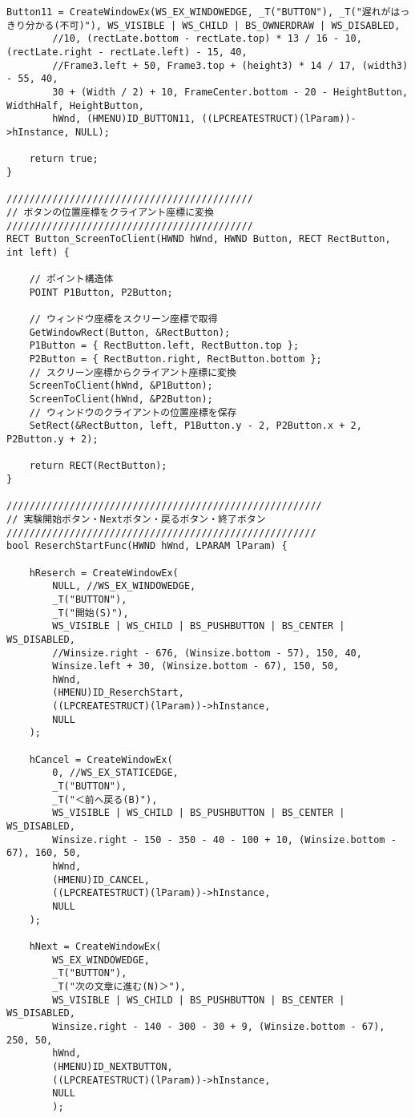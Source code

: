 \begin{lstlisting}[caption=window.cpp]
	Button11 = CreateWindowEx(WS_EX_WINDOWEDGE, _T("BUTTON"), _T("遅れがはっきり分かる(不可)"), WS_VISIBLE | WS_CHILD | BS_OWNERDRAW | WS_DISABLED,
		//10, (rectLate.bottom - rectLate.top) * 13 / 16 - 10, (rectLate.right - rectLate.left) - 15, 40,
		//Frame3.left + 50, Frame3.top + (height3) * 14 / 17, (width3) - 55, 40,
		30 + (Width / 2) + 10, FrameCenter.bottom - 20 - HeightButton, WidthHalf, HeightButton,
		hWnd, (HMENU)ID_BUTTON11, ((LPCREATESTRUCT)(lParam))->hInstance, NULL);

	return true;
}

///////////////////////////////////////////
// ボタンの位置座標をクライアント座標に変換
///////////////////////////////////////////
RECT Button_ScreenToClient(HWND hWnd, HWND Button, RECT RectButton, int left) {

	// ポイント構造体
	POINT P1Button, P2Button;

	// ウィンドウ座標をスクリーン座標で取得
	GetWindowRect(Button, &RectButton);
	P1Button = { RectButton.left, RectButton.top };
	P2Button = { RectButton.right, RectButton.bottom };
	// スクリーン座標からクライアント座標に変換
	ScreenToClient(hWnd, &P1Button);
	ScreenToClient(hWnd, &P2Button);
	// ウィンドウのクライアントの位置座標を保存
	SetRect(&RectButton, left, P1Button.y - 2, P2Button.x + 2, P2Button.y + 2);

	return RECT(RectButton);
}

///////////////////////////////////////////////////////
// 実験開始ボタン・Nextボタン・戻るボタン・終了ボタン
//////////////////////////////////////////////////////
bool ReserchStartFunc(HWND hWnd, LPARAM lParam) {

	hReserch = CreateWindowEx(
		NULL, //WS_EX_WINDOWEDGE,
		_T("BUTTON"),
		_T("開始(S)"),
		WS_VISIBLE | WS_CHILD | BS_PUSHBUTTON | BS_CENTER | WS_DISABLED,
		//Winsize.right - 676, (Winsize.bottom - 57), 150, 40,
		Winsize.left + 30, (Winsize.bottom - 67), 150, 50,
		hWnd,
		(HMENU)ID_ReserchStart,
		((LPCREATESTRUCT)(lParam))->hInstance,
		NULL
	);

	hCancel = CreateWindowEx(
		0, //WS_EX_STATICEDGE,
		_T("BUTTON"),
		_T("＜前へ戻る(B)"),
		WS_VISIBLE | WS_CHILD | BS_PUSHBUTTON | BS_CENTER | WS_DISABLED,
		Winsize.right - 150 - 350 - 40 - 100 + 10, (Winsize.bottom - 67), 160, 50,
		hWnd,
		(HMENU)ID_CANCEL,
		((LPCREATESTRUCT)(lParam))->hInstance,
		NULL
	);

	hNext = CreateWindowEx(
		WS_EX_WINDOWEDGE,
		_T("BUTTON"),
		_T("次の文章に進む(N)＞"),
		WS_VISIBLE | WS_CHILD | BS_PUSHBUTTON | BS_CENTER | WS_DISABLED,
		Winsize.right - 140 - 300 - 30 + 9, (Winsize.bottom - 67), 250, 50,
		hWnd,
		(HMENU)ID_NEXTBUTTON,
		((LPCREATESTRUCT)(lParam))->hInstance,
		NULL
		);


\end{lstlisting}
